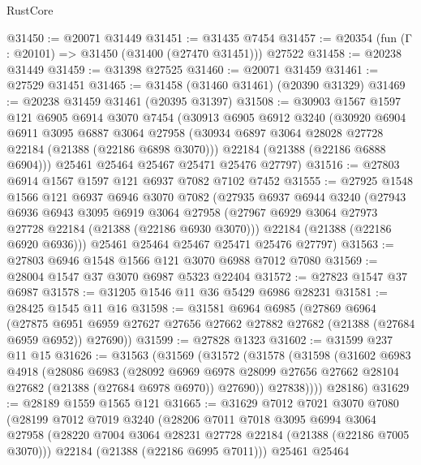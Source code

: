 \begin{lexlean}{RustCore}
\begin{coremodule}
@31450 := @20071 @31449
@31451 := @31435 @7454
@31457 := @20354 (fun (Γ : @20101) => @31450 (@31400 (@27470 @31451))) @27522
@31458 := @20238 @31449
@31459 := @31398 @27525
@31460 := @20071 @31459
@31461 := @27529 @31451
@31465 := @31458 (@31460 @31461) (@20390 @31329)
@31469 := @20238 @31459 @31461 (@20395 @31397)
@31508 := @30903
    @1567
    @1597
    @121
    @6905
    @6914
    @3070
    @7454
    (@30913
      @6905
      @6912
      @3240
      (@30920
        @6904
        @6911
        @3095
        @6887
        @3064
        @27958
        (@30934 @6897 @3064 @28028 @27728 @22184 (@21388 (@22186 @6898 @3070)))
        @22184
        (@21388 (@22186 @6888 @6904)))
      @25461
      @25464
      @25467
      @25471
      @25476
      @27797)
@31516 := @27803 @6914 @1567 @1597 @121 @6937 @7082 @7102 @7452
@31555 := @27925
    @1548
    @1566
    @121
    @6937
    @6946
    @3070
    @7082
    (@27935
      @6937
      @6944
      @3240
      (@27943
        @6936
        @6943
        @3095
        @6919
        @3064
        @27958
        (@27967 @6929 @3064 @27973 @27728 @22184 (@21388 (@22186 @6930 @3070)))
        @22184
        (@21388 (@22186 @6920 @6936)))
      @25461
      @25464
      @25467
      @25471
      @25476
      @27797)
@31563 := @27803 @6946 @1548 @1566 @121 @3070 @6988 @7012 @7080
@31569 := @28004 @1547 @37 @3070 @6987 @5323 @22404
@31572 := @27823 @1547 @37 @6987
@31578 := @31205 @1546 @11 @36 @5429 @6986 @28231
@31581 := @28425 @1545 @11 @16
@31598 := @31581
    @6964
    @6985
    (@27869
      @6964
      (@27875 @6951 @6959 @27627 @27656 @27662 @27882 @27682 (@21388 (@27684 @6959 @6952)) @27690))
@31599 := @27828 @1323
@31602 := @31599 @237 @11 @15
@31626 := @31563
    (@31569
      (@31572
        (@31578
          (@31598
            (@31602
              @6983
              @4918
              (@28086
                @6983
                (@28092
                  @6969
                  @6978
                  @28099
                  @27656
                  @27662
                  @28104
                  @27682
                  (@21388 (@27684 @6978 @6970))
                  @27690))
              @27838))))
      @28186)
@31629 := @28189 @1559 @1565 @121
@31665 := @31629
    @7012
    @7021
    @3070
    @7080
    (@28199
      @7012
      @7019
      @3240
      (@28206
        @7011
        @7018
        @3095
        @6994
        @3064
        @27958
        (@28220 @7004 @3064 @28231 @27728 @22184 (@21388 (@22186 @7005 @3070)))
        @22184
        (@21388 (@22186 @6995 @7011)))
      @25461
      @25464

\end{coremodule}
\end{lexlean}
